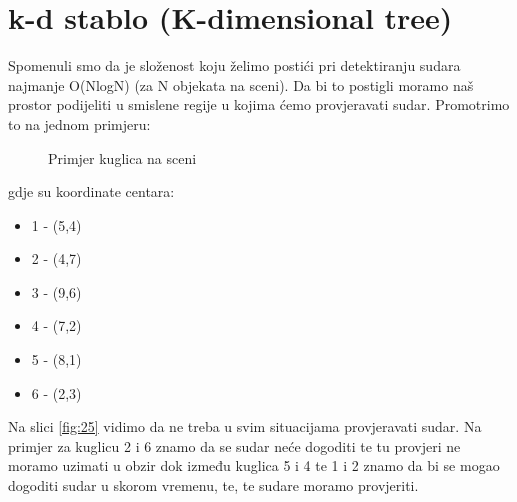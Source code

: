 \section{k-d stablo (K-dimensional tree)}
Spomenuli smo da je složenost koju želimo postići pri detektiranju sudara najmanje O(NlogN) (za N objekata na sceni). Da bi to postigli moramo naš prostor podijeliti u smislene regije u kojima ćemo provjeravati sudar. Promotrimo to na jednom primjeru:
\begin{figure}[!http]	
	\begin{center}
	\end{center}
	\caption{Primjer kuglica na sceni}
	\label{fig:26}
\end{figure}\newline
gdje su koordinate centara:\newpage
\begin{itemize}
	\item 1 - (5,4)
	\item 2 - (4,7)
	\item 3 - (9,6)
	\item 4 - (7,2)
	\item 5 - (8,1)
	\item 6 - (2,3)
\end{itemize}
Na slici \ref{fig:25} vidimo da ne treba u svim situacijama provjeravati sudar. Na primjer za kuglicu 2 i 6 znamo da se sudar neće dogoditi te tu provjeri ne moramo uzimati u obzir dok između kuglica 5 i 4 te 1 i 2 znamo da bi se mogao dogoditi sudar u skorom vremenu, te, te sudare moramo provjeriti.

